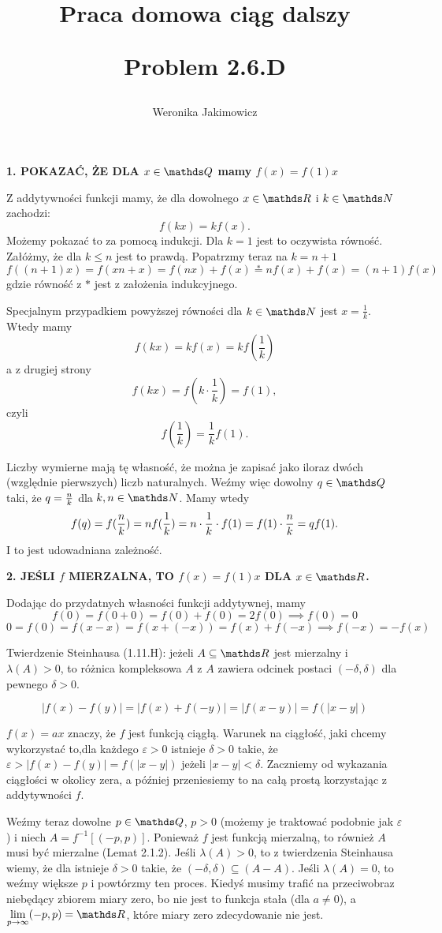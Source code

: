 \documentclass{article}
\title{Praca domowa ciąg dalszy\medskip

\large Problem \textbf{2.6.D}
}
\author{Weronika Jakimowicz}
\date{}
\begin{document}
\maketitle
\thispagestyle{empty}

\textbf{\color{def}1. POKAZAĆ, ŻE DLA $x\in\Q$ mamy $f(x)=f(1)x$}
\medskip

Z addytywności funkcji mamy, że dla dowolnego $x\in\R$ i $k\in\N$ zachodzi:
$$f(kx)=kf(x).$$
Możemy pokazać to za pomocą indukcji. Dla $k=1$ jest to oczywista równość. Załóżmy, że dla $k\leq n$ jest to prawdą. Popatrzmy teraz na $k=n+1$
$$f((n+1)x)=f(xn+x)=f(nx)+f(x)\overset{*}{=}nf(x)+f(x)=(n+1)f(x)$$
gdzie równość z $*$ jest z założenia indukcyjnego.
\medskip

Specjalnym przypadkiem powyższej równości dla $k\in\N$ jest $x=\frac1k$. Wtedy mamy
$$f(kx)=kf(x)=kf(\frac1k)$$
a z drugiej strony
$$f(kx)=f(k\cdot\frac1k)=f(1),$$
czyli
$$f(\frac1k)=\frac1k f(1).$$

Liczby wymierne mają tę własność, że można je zapisać jako iloraz dwóch (względnie pierwszych) liczb naturalnych. Weźmy więc dowolny $q\in\Q$ taki, że $q={n\over k}$ dla $k,n\in\N$. Mamy wtedy
$$f(q)=f(\frac nk)=nf(\frac1k)=n\cdot\frac1k \cdot f(1)=f(1)\cdot{n\over k}=qf(1).$$
I to jest udowadniana zależność.
\bigskip

\textbf{\color{def}2. JEŚLI $f$ MIERZALNA, TO $f(x)=f(1)x$ DLA $x\in\R$.}
\medskip

Dodając do przydatnych własności funkcji addytywnej, mamy
$$f(0)=f(0+0)=f(0)+f(0)=2f(0)\implies f(0)=0$$
$$0=f(0)=f(x-x)=f(x+(-x))=f(x)+f(-x)\implies f(-x)=-f(x)$$

{\color{acc}Twierdzenie Steinhausa} (1.11.H): jeżeli $A\subseteq\R$ jest mierzalny i $\lambda(A)>0$, to różnica kompleksowa $A$ z $A$ zawiera odcinek postaci $(-\delta,\delta)$ dla pewnego $\delta>0$. 
\smallskip

$$|f(x)-f(y)|=|f(x)+f(-y)|=|f(x-y)|=f(|x-y|)$$

$f(x)=ax$ znaczy, że $f$ jest funkcją ciągłą. Warunek na ciągłość, jaki chcemy wykorzystać to,dla każdego $\varepsilon>0$ istnieje $\delta>0$ takie, że $\varepsilon>|f(x)-f(y)|=f(|x-y|)$ jeżeli $|x-y|<\delta$. Zaczniemy od wykazania ciągłości w okolicy zera, a później przeniesiemy to na całą prostą korzystając z addytywności $f$.
\medskip

Weźmy teraz dowolne $p\in\Q$, $p>0$ (możemy je traktować podobnie jak $\varepsilon$) i niech $A=f^{-1}[(-p,p)]$. Ponieważ $f$ jest funkcją mierzalną, to również $A$ musi być mierzalne (Lemat 2.1.2). Jeśli $\lambda(A)>0$, to z twierdzenia Steinhausa wiemy, że dla istnieje $\delta>0$ takie, że $(-\delta,\delta)\subseteq (A-A)$. Jeśli $\lambda(A)=0$, to weźmy większe $p$ i powtórzmy ten proces. Kiedyś musimy trafić na przeciwobraz niebędący zbiorem miary zero, bo nie jest to funkcja stała (dla $a\neq0$), a $\lim\limits_{p\to\infty}(-p,p)=\R$, które miary zero zdecydowanie nie jest.
\smallskip
\end{document}

